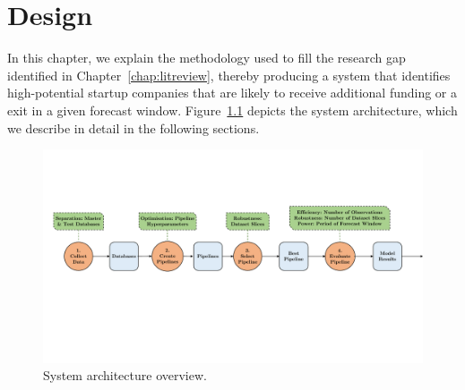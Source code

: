 \documentclass[../thesis/thesis.tex]{subfiles}
\begin{document}
\chapter{Design}
\label{chap:design}

In this chapter, we explain the methodology used to fill the research gap identified in Chapter~\ref{chap:litreview}, thereby producing a system that identifies high-potential startup companies that are likely to receive additional funding or a exit in a given forecast window. Figure~\ref{fig:design:system_architecture} depicts the system architecture, which we describe in detail in the following sections.

\begin{figure}[!htb]
    \centering
    \includegraphics[width=\textwidth]{../figures/design/system_architecture}
    \caption{System architecture overview.}
    \label{fig:design:system_architecture}
\end{figure}
\end{document}
